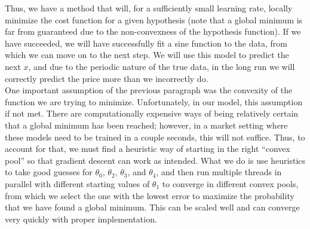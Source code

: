 \documentclass{article}
\begin{document}
Thus, we have a method that will, for a sufficiently small learning rate, locally minimize the cost function for a given hypothesis (note that a global minimum is far from guaranteed due to the non-convexness of the hypothesis function). If we have succeeded, we will have successfully fit a sine function to the data, from which we can move on to the next step. We will use this model to predict the next $x$, and due to the periodic nature of the true data, in the long run we will correctly predict the price more than we incorrectly do. \\\newline
One important assumption of the previous paragraph was the convexity of the function we are trying to minimize. Unfortunately, in our model, this assumption if not met. There are computationally expensive ways of being relatively certain that  a global minimum has been reached; however, in a market setting where these models need to be trained in a couple seconds, this will not suffice. Thus, to account for that, we must find a heuristic way of starting in the right ``convex pool'' so that gradient descent can work as intended. What we do is use heuristics to take good guesses for $\theta_0$, $\theta_2$, $\theta_3$, and $\theta_4$, and then run multiple threads in parallel with different starting values of $\theta_1$ to converge in different convex pools, from which we select the one with the lowest error to maximize the probability that we have found a global minimum. This can be scaled well and can converge very quickly with proper implementation. 
\end{document}
